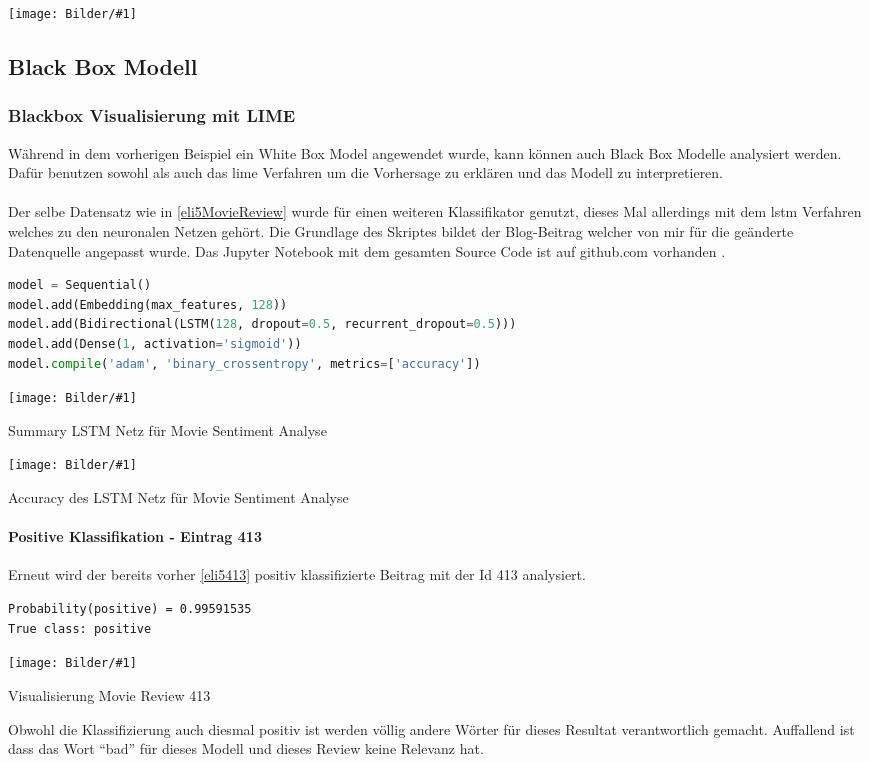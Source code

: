 \documentclass[
  12pt, %
  a4paper, %
  oneside, %
  openany, 
  numbers=noenddot, %
  BCOR=5mm, %
  parskip=half*, %
  thesis, %
]{bfhbook}
\newcommand{\imgText}[3]{
\begin{center}
    \begin{minipage}[t]{0.6\textwidth}
    		\vspace{0pt}
		\texttt{[image: Bilder/\#1]}
		\caption{#2}
	\end{minipage}\hfill
    \begin{minipage}[t]{0.4\textwidth}
    		\vspace{5pt}
  		#3
    \end{minipage}
\end{center}
}
\begin{document}
\imgText{MovieReview-NaiveBayes-Display-414.PNG}{}{
}

\subsection{Black Box Modell}

\subsubsection*{Blackbox Visualisierung mit LIME}
Während in dem vorherigen Beispiel ein \Gls{White Box} Model angewendet wurde, kann können auch \Gls{Black Box} Modelle analysiert werden. Dafür benutzen sowohl \cite{ELI5} als auch \cite{lime} das \acrshort{lime} Verfahren um die Vorhersage zu erklären und das Modell zu interpretieren.
\\\\
Der selbe Datensatz wie in \ref{eli5MovieReview} wurde für einen weiteren Klassifikator genutzt, dieses Mal allerdings mit dem \acrfull{lstm} Verfahren welches zu den neuronalen Netzen gehört. Die Grundlage des Skriptes bildet der Blog-Beitrag \parencite{nThLIME} welcher von mir für die geänderte Datenquelle angepasst wurde. Das Jupyter Notebook mit dem gesamten Source Code ist auf github.com vorhanden \parencite{textClassLime}.

\begin{lstlisting}[language=Python, caption=LSTM Modell für LIME Movie Sentiment Analyse]
model = Sequential()
model.add(Embedding(max_features, 128))
model.add(Bidirectional(LSTM(128, dropout=0.5, recurrent_dropout=0.5)))
model.add(Dense(1, activation='sigmoid'))
model.compile('adam', 'binary_crossentropy', metrics=['accuracy'])
\end{lstlisting}

\imgText{MovieReview-LSTM-Summary.PNG}{Summary LSTM Netz für Movie Sentiment Analyse}{

}

\imgText{MovieReview-LSTM-Accuracy.PNG}{Accuracy des LSTM Netz für Movie Sentiment Analyse}{

}

\paragraph*{Positive Klassifikation - Eintrag 413}
Erneut wird der bereits vorher \ref{eli5413} positiv klassifizierte Beitrag mit der Id 413 analysiert.
\begin{lstlisting}
Probability(positive) = 0.99591535
True class: positive
\end{lstlisting}
\imgText{MovieReview-LSTM-Display-413.PNG}{Visualisierung Movie Review 413}{
Obwohl die Klassifizierung auch diesmal positiv ist werden völlig andere Wörter für dieses Resultat verantwortlich gemacht.
Auffallend ist dass das Wort ``bad'' für dieses Modell und dieses Review keine Relevanz hat.
}
\end{document}
